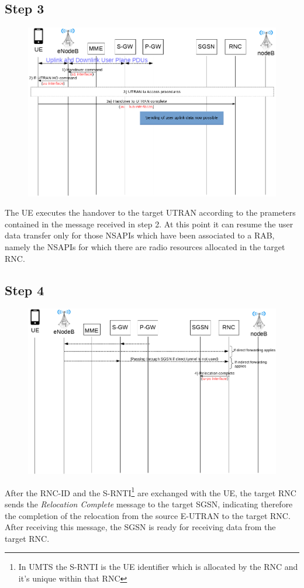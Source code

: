 \subsection*{Step 3}
\begin{figure}[!htb]
	\centering
	\includegraphics[width=0.9\linewidth]{img/execution-3.png}
	\label{fig:exec-3}
\end{figure}
The UE executes the handover to the target UTRAN according to the prameters
contained in the message received in step 2. At this point it can resume the user
data transfer only for those NSAPIs which have been associated to a RAB, namely
the NSAPIs for which there are radio resources allocated in the target RNC.




\subsection*{Step 4}
\begin{figure}[!htb]
	\centering
	\includegraphics[width=0.9\linewidth]{img/execution-4.png}
	\label{fig:exec-4}
\end{figure}
After the RNC-ID and the S-RNTI\footnote{In UMTS the S-RNTI is the UE identifier which is allocated
by the RNC and it's unique within that RNC} are exchanged with the UE, the target
RNC sends the \emph{Relocation Complete} message to the target SGSN, indicating
therefore the completion of the relocation from the source E-UTRAN to the target
RNC. After receiving this message, the SGSN is ready for receiving data from
the target RNC.




